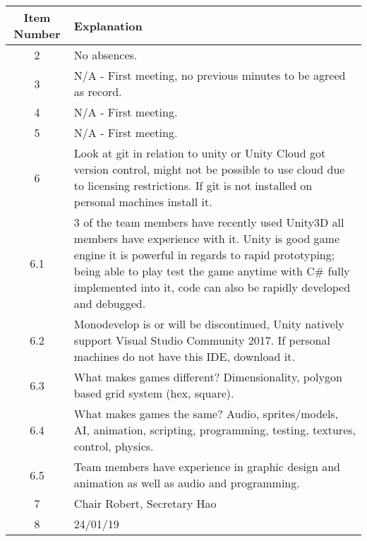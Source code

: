 \documentclass{article}
\begin{document}
\begin{table}[H]
	\centering
	\begin{tabular}{| c | p{9cm} |}
		\hline
		Item Number & Explanation \\ \hline
		2 & No absences.\\ \hline
		3 & N/A - First meeting, no previous minutes to be agreed as record.\\ \hline
		4 & N/A - First meeting. \\ \hline
		5 & N/A - First meeting. \\ \hline
		6 & Look at git in relation to unity or Unity Cloud got version control, might not be possible to use cloud due to licensing restrictions. If git is not installed on personal machines install it. \\ \hline
		6.1 & 3 of the team members have recently used Unity3D all members have experience with it. Unity is good game engine it is powerful in regards to rapid prototyping; being able to play test the game anytime with C\# fully implemented into it, code can also be rapidly developed and debugged. \\ \hline
		6.2 & Monodevelop is or will be discontinued, Unity natively support Visual Studio Community 2017. If personal machines do not have this IDE, download it. \\ \hline
		6.3 & What makes games different? Dimensionality, polygon based grid system (hex, square).  \\ \hline
		6.4 &  What makes games the same? Audio, sprites/models, AI, animation, scripting, programming, testing, textures, control, physics. \\ \hline
		6.5 & Team members have experience in graphic design and animation as well as audio and programming. \\ \hline
		7 & Chair Robert, Secretary Hao\\ \hline
		8 & 24/01/19 \\ \hline
		
	\end{tabular}
\end{table}
\end{document}
